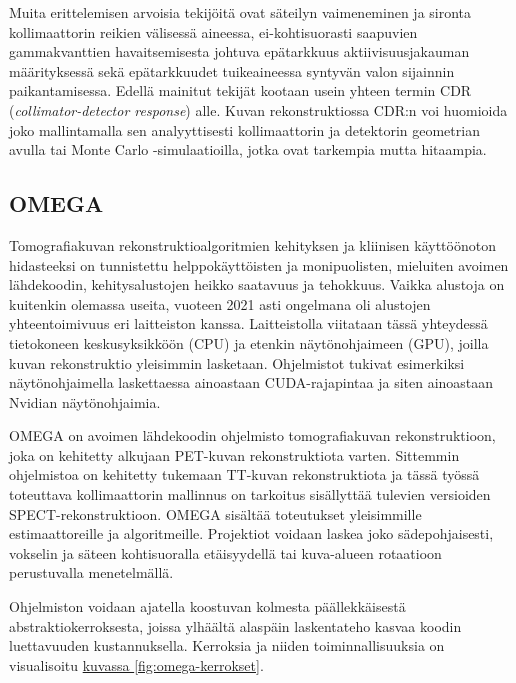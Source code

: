 Muita erittelemisen arvoisia tekijöitä ovat säteilyn vaimeneminen ja sironta kollimaattorin reikien välisessä aineessa, ei-kohtisuorasti saapuvien gammakvanttien havaitsemisesta johtuva epätarkkuus aktiivisuusjakauman määrityksessä sekä epätarkkuudet tuikeaineessa syntyvän valon sijainnin paikantamisessa\cite{king_attenuation_2004, frey_collimator-detector_2006}. Edellä mainitut tekijät kootaan usein yhteen termin CDR (\textit{collimator-detector response}) alle. Kuvan rekonstruktiossa CDR:n voi huomioida joko mallintamalla sen analyyttisesti kollimaattorin ja detektorin geometrian avulla tai Monte Carlo -simulaatioilla, jotka ovat tarkempia mutta hitaampia.\cite{frey_collimator-detector_2006}

\subsection{OMEGA}
Tomografiakuvan rekonstruktioalgoritmien kehityksen ja kliinisen käyttöönoton hidasteeksi on tunnistettu helppokäyttöisten ja monipuolisten, mieluiten avoimen lähdekoodin, kehitysalustojen heikko saatavuus ja tehokkuus\cite{hutton_origins_2014}. Vaikka alustoja on kuitenkin olemassa useita, vuoteen 2021 asti ongelmana oli alustojen yhteentoimivuus eri laitteiston kanssa. Laitteistolla viitataan tässä yhteydessä tietokoneen keskusyksikköön (CPU) ja etenkin näytönohjaimeen (GPU), joilla kuvan rekonstruktio yleisimmin lasketaan. Ohjelmistot tukivat esimerkiksi näytönohjaimella laskettaessa ainoastaan CUDA-rajapintaa ja siten ainoastaan Nvidian näytönohjaimia.\cite{wettenhovi_omegaopen-source_2021}

OMEGA on avoimen lähdekoodin ohjelmisto tomografiakuvan rekonstruktioon, joka on kehitetty alkujaan PET-kuvan rekonstruktiota varten\cite{wettenhovi_omegaopen-source_2021, wettenhovi_transmission_2021}. Sittemmin ohjelmistoa on kehitetty tukemaan TT-kuvan rekonstruktiota\cite{wettenhovi_transmission_2021} ja tässä työssä toteuttava kollimaattorin mallinnus on tarkoitus sisällyttää tulevien versioiden SPECT-rekonstruktioon. OMEGA sisältää toteutukset yleisimmille estimaattoreille ja algoritmeille. Projektiot voidaan laskea joko sädepohjaisesti\cite{siddon_fast_1985, sundermann_fast_1998}, vokselin ja säteen kohtisuoralla etäisyydellä\cite{aguiar_geometrical_2010} tai kuva-alueen rotaatioon perustuvalla menetelmällä\cite{zeng_frequency_1992, zeng_rotating_1994}.\cite{wettenhovi_omegaopen-source_2021}

Ohjelmiston voidaan ajatella koostuvan kolmesta päällekkäisestä abstraktiokerroksesta, joissa ylhäältä alaspäin laskentateho kasvaa koodin luettavuuden kustannuksella. Kerroksia ja niiden toiminnallisuuksia on visualisoitu \hyperref[fig:omega-kerrokset]{kuvassa \ref*{fig:omega-kerrokset}}.


